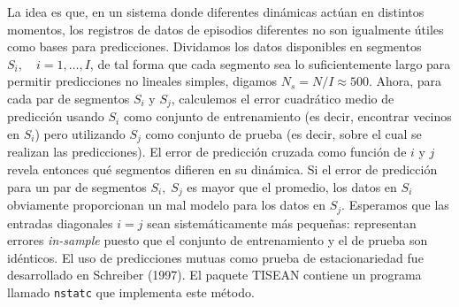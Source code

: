\documentclass[10pt,a4paper]{book}
\begin{document}
\bigskip

La idea es que, en un sistema donde diferentes dinámicas actúan en distintos momentos, los registros de datos de episodios diferentes no son igualmente útiles como bases para predicciones. Dividamos los datos disponibles en segmentos $S_i, \quad i = 1, \dots, I$, de tal forma que cada segmento sea lo suficientemente largo para permitir predicciones no lineales simples, digamos $N_s = N/I \approx 500$. Ahora, para cada par de segmentos $S_i$ y $S_j$, calculemos el error cuadrático medio de predicción usando $S_i$ como conjunto de entrenamiento (es decir, encontrar vecinos en $S_i$) pero utilizando $S_j$ como conjunto de prueba (es decir, sobre el cual se realizan las predicciones). El error de predicción cruzada como función de $i$ y $j$ revela entonces qué segmentos difieren en su dinámica. Si el error de predicción para un par de segmentos $S_i, \; S_j$ es mayor que el promedio, los datos en $S_i$ obviamente proporcionan un mal modelo para los datos en $S_j$. Esperamos que las entradas diagonales $i = j$ sean sistemáticamente más pequeñas: representan errores \textit{in-sample} puesto que el conjunto de entrenamiento y el de prueba son idénticos. El uso de predicciones mutuas como prueba de estacionariedad fue desarrollado en Schreiber (1997). El paquete TISEAN contiene un programa llamado \texttt{nstatc} que implementa este método.

\bigskip
\end{document}

